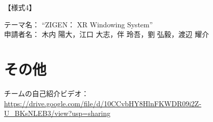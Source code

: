 \documentclass[uplatex]{jsarticle}
\begin{document}
\begin{flushright}
  【様式4】
\end{flushright}
テーマ名： ``ZIGEN： XR Windowing System'' \\
申請者名： 木内 陽大，江口 大志，伴 玲吾，劉 弘毅，渡辺 耀介













\section{その他}

チームの自己紹介ビデオ：\url{https://drive.google.com/file/d/10CCvbHY8HlnFKWDR09i2Z-U_BKsNLEB3/view?usp=sharing}


\end{document}
